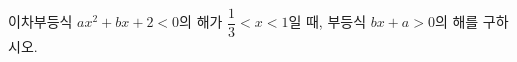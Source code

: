 \hspace*{2mm}\begin{minipage}[t]{\dimexpr\linewidth-2mm\relax}\vspace{0pt}
이차부등식 $ax^2+bx+2<0$의 해가 $\dfrac{1}{3}<x<1$일 때, 부등식 $bx+a>0$의 해를 구하시오. \end{minipage}
